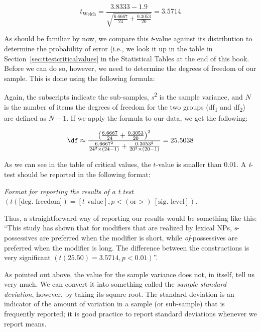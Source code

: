 \[t_{\text{Welch}} = \frac{3.8333 - 1.9}{\sqrt{\frac{6.6667}{24} + \frac{0.3053}{20}}} = 3.5714\]

As should be familiar by now, we compare this \textit{t}-value against its distribution  to determine the probability  of error (i.e., we look it up in the table in Section~\ref{sec:ttestcriticalvalues} in the Statistical Tables at the end of this book. Before we can do so, however, we need to determine the degrees of freedom of our sample. This is done using the following formula:

\begin{exe}
\ex \label{ex:formulawelchdf}
\end{exe}

Again, the subscripts indicate the sub\hyp{}samples, \textit{s}\textsuperscript{2} is the sample variance,  and $N$ is the number of items the degrees of freedom for the two groups (df\textsubscript{1} and df\textsubscript{2}) are defined as $N-1$. If we apply the formula to our data, we get the following:

\[\df \approx \frac{\left(\frac{6.6667}{24} + \frac{0.3053}{20}\right)^2}{\frac{6.6667^2}{24^2 \times (24-1)} + \frac{0.3053^2}{20^2 \times (20-1)}} = 25.5038\]

As we can see in the table of critical values, the $t$-value is smaller than 0.01. A \textit{t}-test  should be reported in the following format:

\begin{exe}
\ex \textit{Format for reporting the results of a t test} \\
$(t (\text{[deg. freedom]}) = [t \text{ value}], p < (\text{or} >)~[\text{sig. level}])$.
\label{ex:reportingwelchst}
\end{exe}

Thus, a straightforward way of reporting our results would be something like this: ``This study has shown that for modifiers that are realized by lexical NPs, \textit{s}-possessives  are preferred when the modifier is short, while \textit{of}-possessives are preferred when the modifier is long. The difference between the constructions is very significant  $(t(25.50) = 3.5714, p < 0.01)$''.

As pointed out above, the value for the sample variance  does not, in itself, tell us very much. We can convert it into something called the \textit{sample standard deviation}, however, by taking its square root. The standard deviation is an indicator of the amount of variation  in a sample (or sub\hyp{}sample) that is frequently reported; it is good practice to report standard deviations whenever we report means.

